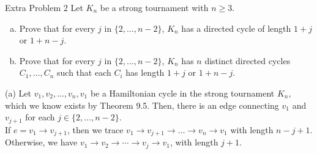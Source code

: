 \documentclass[8pt]{extarticle}
\begin{document}
  \pagebreak
  \begin{problem}{Extra Problem 2}
    Let $K_n$ be a strong tournament with $n \geq 3$. 
    \begin{enumerate}[(a)]
      \item Prove that for every $j$ in $\{2,\dots,n-2\}$, $K_n$ has a directed cycle of length $1 + j$ or $1 + n - j$. 
      \item Prove that for every $j$ in $\{2,\dots,n-2\}$, $K_n$ has $n$ distinct directed cycles $C_1,\dots,C_n$ such that each $C_i$ has length $1 + j$ or $1 + n - j$.
    \end{enumerate}
    \tcblower
    \begin{problem}{(a)}
      Let $v_1,v_2,\dots,v_n,v_1$ be a Hamiltonian cycle in the strong tournament $K_n$, which we know exists by Theorem 9.5. Then, there is an edge connecting $v_1$ and $v_{j+1}$ for each $j\in \{2,\dots,n-2\}$.\\

      If $e = v_1\rightarrow v_{j+1}$, then we trace $v_1\rightarrow v_{j+1}\rightarrow \dots\rightarrow v_n\rightarrow v_1$ with length $n-j+1$. Otherwise, we have $v_1\rightarrow v_2\rightarrow \cdots \rightarrow v_j\rightarrow v_1$, with length $j+1$.
    \end{problem}
  \end{problem}
\end{document}
